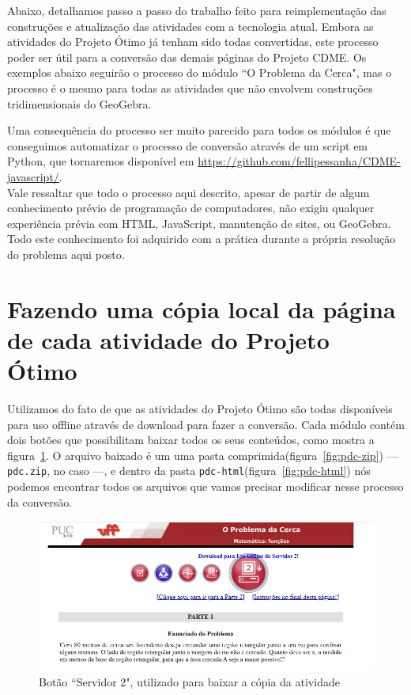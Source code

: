 Abaixo, detalhamos passo a passo do trabalho feito para reimplementação das construções e atualização das atividades com a tecnologia atual. Embora as atividades do Projeto Ótimo já tenham sido todas convertidas, este processo poder ser útil para a conversão das demais páginas do Projeto CDME. Os exemplos abaixo seguirão o processo do módulo ``O Problema da Cerca", mas o processo é o mesmo para todas as atividades que não envolvem construções tridimensionais do GeoGebra.

Uma consequência do processo ser muito parecido para todos os módulos é que conseguimos automatizar o processo de conversão através de um script em Python, que tornaremos disponível em \url{https://github.com/fellipessanha/CDME-javascript/}.
\\

Vale ressaltar que todo o processo aqui descrito, apesar de partir de algum conhecimento prévio de programação de computadores, não exigiu qualquer experiência prévia com HTML, JavaScript, manutenção de sites, ou GeoGebra. Todo este conhecimento foi adquirido com a prática durante a própria resolução do problema aqui posto.

\section{Fazendo uma cópia local da página de cada atividade do Projeto Ótimo}

Utilizamos do fato de que as atividades do Projeto Ótimo são todas disponíveis para uso offline através de download para fazer a conversão. Cada módulo contém dois botões que possibilitam baixar todos os seus conteúdos, como mostra a figura~\ref{fig:serv02}. O arquivo baixado é um uma pasta comprimida(figura~\ref{fig:pdc-zip}) --- \texttt{pdc.zip}, no caso ---, e dentro da pasta \texttt{pdc-html}(figura~\ref{fig:pdc-html}) nós podemos encontrar todos os arquivos que vamos precisar modificar nesse processo da conversão.

\begin{figure}[hbt]
    \centering
    \includegraphics[width=\textwidth]{media/tec-print-servidor02.jpg}
    \caption{Botão ``Servidor 2", utilizado para baixar a cópia da atividade}
    \label{fig:serv02}
\end{figure}


